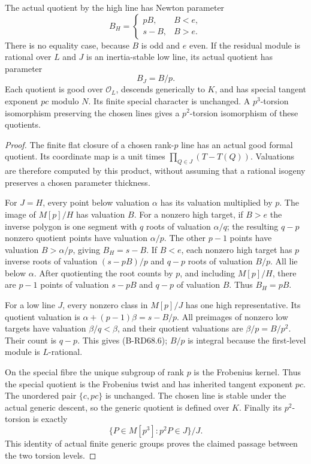 \begin{lemma}
\label{lem:B-RD68-quotients}
The actual quotient by the high line has Newton parameter
\[
 B_H=\begin{cases}
       pB,&B<e,\\
       s-B,&B>e.
      \end{cases}
 \tag{B-RD68.5}
\]
There is no equality case, because \(B\) is odd and \(e\) even.
If the residual module is rational over \(L\) and \(J\) is an
inertia-stable low line, its actual quotient has parameter
\[
 B_J=B/p .
 \tag{B-RD68.6}
\]
Each quotient is good over \(\mathcal O_L\), descends generically
to \(K\), and has special tangent exponent \(pc\) modulo \(N\).
Its finite special character is unchanged. A \(p^3\)-torsion
isomorphism preserving the chosen lines gives a \(p^2\)-torsion
isomorphism of these quotients.
\end{lemma}
\begin{proof}
The finite flat closure of a chosen rank-\(p\) line has an
actual good formal quotient. Its coordinate map is a unit times
\(\prod_{Q\in J}(T-T(Q))\). Valuations are therefore computed
by this product, without assuming that a rational isogeny
preserves a chosen parameter thickness.

For \(J=H\), every point below valuation \(\alpha\) has its
valuation multiplied by \(p\). The image of \(M[p]/H\) has
valuation \(B\). For a nonzero high target, if \(B>e\) the
inverse polygon is one segment with \(q\) roots of valuation
\(\alpha/q\); the resulting \(q-p\) nonzero quotient points
have valuation \(\alpha/p\). The other \(p-1\) points have
valuation \(B>\alpha/p\), giving \(B_H=s-B\).
If \(B<e\), each nonzero high target has \(p\) inverse roots
of valuation \((s-pB)/p\) and \(q-p\) roots of valuation \(B/p\).
All lie below \(\alpha\). After quotienting the root counts
by \(p\), and including \(M[p]/H\), there are \(p-1\)
points of valuation \(s-pB\) and \(q-p\) of valuation \(B\).
Thus \(B_H=pB\).

For a low line \(J\), every nonzero class in \(M[p]/J\)
has one high representative. Its quotient valuation is
\(\alpha+(p-1)\beta=s-B/p\). All preimages of nonzero low
targets have valuation \(\beta/q<\beta\), and their quotient
valuations are \(\beta/p=B/p^2\). Their count is \(q-p\).
This gives (B-RD68.6); \(B/p\) is integral because the
first-level module is \(L\)-rational.

On the special fibre the unique subgroup of rank \(p\) is
the Frobenius kernel. Thus the special quotient is the
Frobenius twist and has inherited tangent exponent \(pc\).
The unordered pair \(\{c,pc\}\) is unchanged.
The chosen line is stable under the actual generic descent,
so the generic quotient is defined over \(K\).
Finally its \(p^2\)-torsion is exactly
\[
 \{P\in M[p^3]:p^2P\in J\}/J .
 \tag{B-RD68.7}
\]
This identity of actual finite generic groups proves the
claimed passage between the two torsion levels.
\end{proof}

